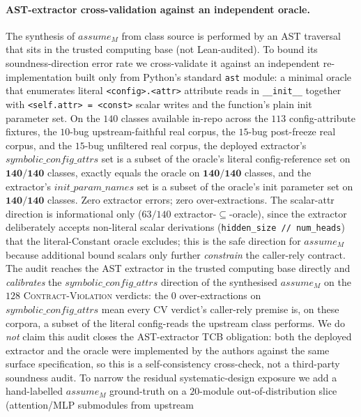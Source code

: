 \paragraph{AST-extractor cross-validation against an independent oracle.}
The synthesis of $\mathit{assume}_M$ from class source is performed by
an AST traversal that sits in the trusted computing base (not
Lean-audited). To bound its soundness-direction error rate we
cross-validate it against an independent re-implementation built
only from Python's standard \texttt{ast} module: a minimal oracle
that enumerates literal \texttt{<config>.<attr>} attribute reads in
\texttt{\_\_init\_\_} together with \texttt{<self.attr> = <const>}
scalar writes and the function's plain init parameter set. On the
$140$ classes available in-repo across the $113$ config-attribute
fixtures, the $10$-bug upstream-faithful real corpus, the
$15$-bug post-freeze real corpus, and the $15$-bug unfiltered real
corpus, the deployed extractor's $\mathit{symbolic\_config\_attrs}$
set is a subset of the oracle's literal config-reference set on
$\mathbf{140/140}$ classes, exactly equals the oracle on
$\mathbf{140/140}$ classes, and the extractor's
$\mathit{init\_param\_names}$ set is a subset of the oracle's init
parameter set on $\mathbf{140/140}$ classes. Zero extractor errors;
zero over-extractions. The scalar-attr direction is informational
only ($63/140$ extractor-$\subseteq$-oracle), since the extractor
deliberately accepts non-literal scalar derivations
(\texttt{hidden\_size // num\_heads}) that the literal-Constant
oracle excludes; this is the safe direction for $\mathit{assume}_M$
because additional bound scalars only further \emph{constrain} the
caller-rely contract. The audit reaches the AST extractor in
the trusted computing base directly and \emph{calibrates} the
$\mathit{symbolic\_config\_attrs}$ direction of the synthesised
$\mathit{assume}_M$ on the $128$ \textsc{Contract-Violation}
verdicts: the $0$ over-extractions on
$\mathit{symbolic\_config\_attrs}$ mean every \textsc{CV}
verdict's caller-rely premise is, on these corpora, a subset of
the literal config-reads the upstream class performs. We do
\emph{not} claim this audit closes the AST-extractor TCB
obligation: both the deployed extractor and the oracle were
implemented by the authors against the same surface
specification, so this is a self-consistency cross-check, not a
third-party soundness audit. To narrow the residual
systematic-design exposure we add a hand-labelled
$\mathit{assume}_M$ ground-truth on a $20$-module
out-of-distribution slice (attention/MLP submodules from upstream
